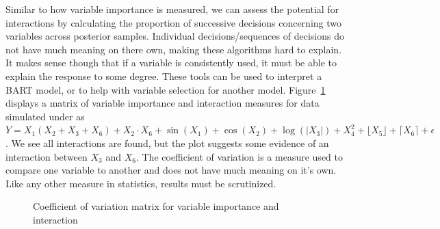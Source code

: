 \documentclass[
  12pt,
  letterpaper,
  DIV=11,
  numbers=noendperiod]{scrartcl}
\begin{document}
Similar to how variable importance is measured, we can assess the
potential for interactions by calculating the proportion of successive
decisions concerning two variables across posterior samples. Individual
decisions/sequences of decisions do not have much meaning on there own,
making these algorithms hard to explain. It makes sense though that if a
variable is consistently used, it must be able to explain the response
to some degree. These tools can be used to interpret a BART model, or to
help with variable selection for another model.
Figure~\ref{fig-vimp_vint} displays a matrix of variable importance and
interaction measures for data simulated under as
\(Y=X_1(X_2 + X_3+X_6)+X_2\cdot X_6+\sin(X_1)+\cos(X_2)+\log(|X_3|)+X_4^2+\lfloor X_5\rfloor+\lceil X_6\rceil+\epsilon\).
We see all interactions are found, but the plot suggests some evidence
of an interaction between \(X_3\) and \(X_6\). The coefficient of
variation is a measure used to compare one variable to another and does
not have much meaning on it's own. Like any other measure in statistics,
results must be scrutinized.

\begin{figure}[H]


\caption{\label{fig-vimp_vint}Coefficient of variation matrix for
variable importance and interaction}

\end{figure}%
\end{document}
